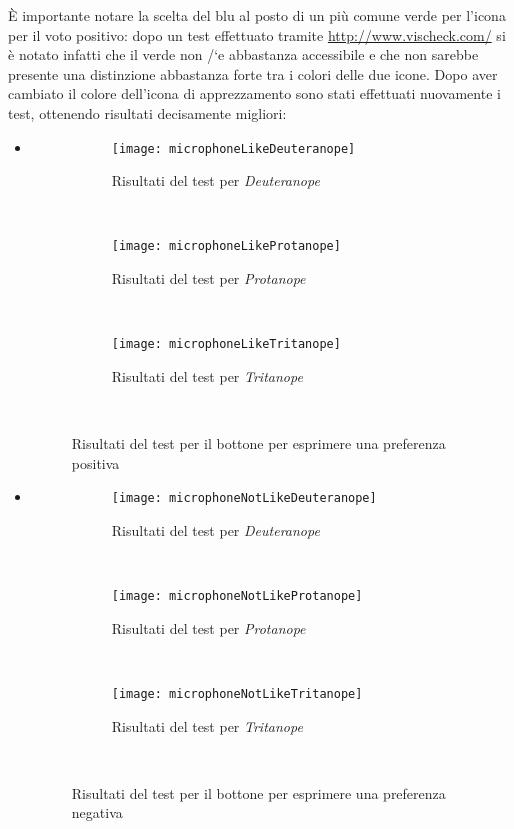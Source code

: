 \`E importante notare la scelta del blu al posto di un pi\`u comune verde per l'icona per il voto positivo: dopo un test effettuato tramite \url{http://www.vischeck.com/} si \`e notato infatti che il verde non /`e abbastanza accessibile e che non sarebbe presente una distinzione abbastanza forte tra i colori delle due icone. Dopo aver cambiato il colore dell'icona di apprezzamento sono stati effettuati nuovamente i test, ottenendo risultati decisamente migliori:
\begin{itemize}

    \item[]

        \begin{figure}[H]
            \centering
            \begin{subfigure}[b]{0.3\textwidth}
                \texttt{[image: microphoneLikeDeuteranope]}
                \caption{Risultati del test per \textit{Deuteranope}}
            \end{subfigure}
        ~
            \begin{subfigure}[b]{0.3\textwidth}
                \texttt{[image: microphoneLikeProtanope]}
                \caption{Risultati del test per \textit{Protanope}}
            \end{subfigure}
        ~
            \begin{subfigure}[b]{0.3\textwidth}
                \texttt{[image: microphoneLikeTritanope]}
                \caption{Risultati del test per \textit{Tritanope}}
            \end{subfigure}
        ~
            \caption{Risultati del test per il bottone per esprimere una preferenza positiva}
        \end{figure}

    \item[]

        \begin{figure}[H]
            \centering
            \begin{subfigure}[b]{0.3\textwidth}
                \texttt{[image: microphoneNotLikeDeuteranope]}
                \caption{Risultati del test per \textit{Deuteranope}}
            \end{subfigure}
        ~
            \begin{subfigure}[b]{0.3\textwidth}
                \texttt{[image: microphoneNotLikeProtanope]}
                \caption{Risultati del test per \textit{Protanope}}
            \end{subfigure}
        ~
            \begin{subfigure}[b]{0.3\textwidth}
                \texttt{[image: microphoneNotLikeTritanope]}
                \caption{Risultati del test per \textit{Tritanope}}
            \end{subfigure}
        ~
            \caption{Risultati del test per il bottone per esprimere una preferenza negativa}
        \end{figure}

\end{itemize}

